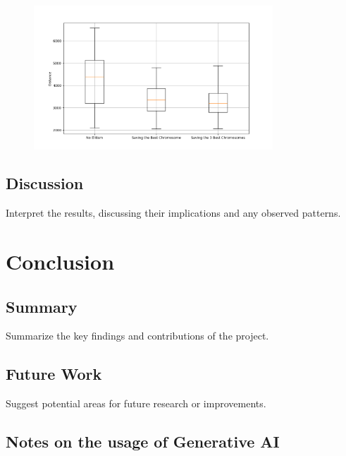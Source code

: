 \documentclass[11pt]{article}
\begin{document}
\begin{figure}
    \includegraphics[width=0.8\textwidth]{../results/elitism_boxplot.png}
    \label{fig:elitism}
\end{figure}


\subsection{Discussion}
Interpret the results, discussing their implications and any observed patterns.

\section{Conclusion}
\subsection{Summary}
Summarize the key findings and contributions of the project.

\subsection{Future Work}
Suggest potential areas for future research or improvements.

\subsection{Notes on the usage of Generative AI}
\end{document}
